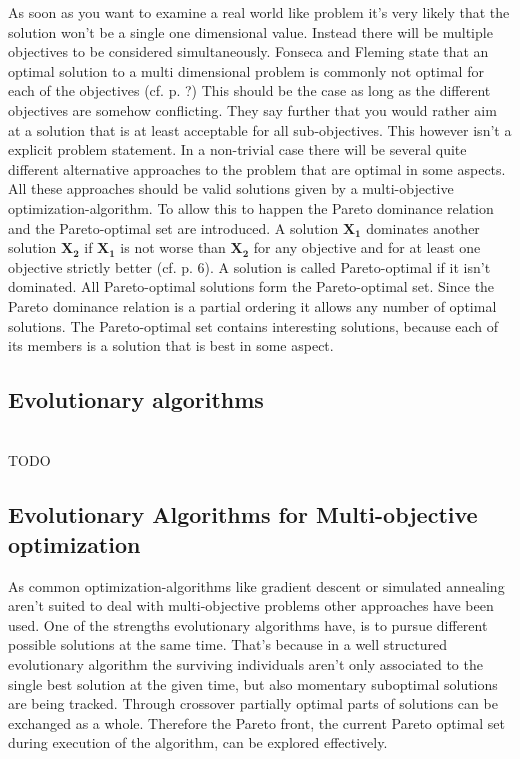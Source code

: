 \documentclass[12pt,twoside]{article}
\theoremstyle{plain}
\theoremstyle{definition}
\theoremstyle{remark}
\begin{document}
As soon as you want to examine a real world like problem it's very likely that the solution won't be a single one dimensional value. Instead there will be multiple objectives to be considered simultaneously.
Fonseca and Fleming state that an optimal solution to a multi dimensional problem is commonly not optimal for each of the objectives (cf. \cite{fonseca1995overview} p. ?)
This should be the case as long as the different objectives are somehow conflicting.
They say further that you would rather aim at a solution that is at least acceptable for all sub-objectives.
This however isn't a explicit problem statement. In a non-trivial case there will be several quite different alternative approaches to the problem that are optimal in some aspects.
All these approaches should be valid solutions given by a multi-objective optimization-algorithm.
To allow this to happen the Pareto dominance relation and the Pareto-optimal set are introduced.
A solution $\mathbf{X_1}$ dominates another solution $\mathbf{X_2}$ if $\mathbf{X_1}$ is not worse than $\mathbf{X_2}$ for any objective and for at least one objective strictly better (cf. \cite{doncieux2015multi} p. 6).
A solution is called Pareto-optimal if it isn't dominated. All Pareto-optimal solutions form the Pareto-optimal set. 
Since the Pareto dominance relation is a partial ordering it allows any number of optimal solutions.
The Pareto-optimal set contains interesting solutions, because each of its members is a solution that is best in some aspect.

\subsection{Evolutionary algorithms}
\label{back:evo}
\cite{eiben2004introduction}\\
TODO
\subsection{Evolutionary Algorithms for Multi-objective optimization}
\label{back:evo_in_multi-opt}
As common optimization-algorithms like gradient descent or simulated annealing aren't suited to deal with multi-objective problems \cite{fonseca1995overview} other approaches have been used.
One of the strengths evolutionary algorithms have, is to pursue different possible solutions at the same time. That's because in a well structured evolutionary algorithm the surviving individuals aren't only associated to the single best solution at the given time, but also momentary suboptimal solutions are being tracked.
Through crossover partially optimal parts of solutions can be exchanged as a whole. 
Therefore the Pareto front, the current Pareto optimal set during execution of the algorithm, can be explored effectively.
\end{document}

